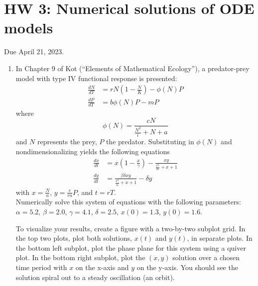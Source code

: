 \documentclass[11pt]{article}
\begin{document}
\section*{HW 3: Numerical solutions of ODE models}
Due April 21, 2023.

\begin{enumerate}
	\item In Chapter 9 of Kot (``Elements of Mathematical Ecology''), a predator-prey model with type IV functional response is presented:
	\begin{align*}
		\frac{dN}{dT} &= rN\left(1-\frac{N}{K}\right) - \phi(N)P\\
		\frac{dP}{dT} &= b\phi(N)P-mP
	\end{align*}
	where
	\[
	\phi(N) = \frac{cN}{\frac{N^2}{i}+N+a}
	\]
	and $N$ represents the prey, $P$ the predator. Substituting in $\phi(N)$ and nondimensionalizing yields the following equations
	\begin{align*}
		\frac{dx}{dt} &= x\left(1-\frac{x}{\gamma}\right) - \frac{xy}{\frac{x^2}{\alpha}+x+1}\\
		\frac{dy}{dt} &= \frac{\beta\delta xy}{\frac{x^2}{\alpha}+x+1} - \delta y
	\end{align*}
	with $x=\frac{N}{a}$, $y=\frac{c}{ra}P$, and $t=rT$.\\
	Numerically solve this system of equations with the following parameters:\\
	$\alpha=5.2$, $\beta=2.0$, $\gamma=4.1$, $\delta=2.5$, $x(0)=1.3$, $y(0)=1.6$.
	
	To visualize your results, create a figure with a two-by-two subplot grid. In the top two plots, plot both solutions, $x(t)$ and $y(t)$, in separate plots. In the bottom left subplot, plot the phase plane for this system using a quiver plot. In the bottom right subplot, plot the $(x,y)$ solution over a chosen time period with $x$ on the x-axis and $y$ on the y-axis. You should see the solution spiral out to a steady oscillation (an orbit).
	

\end{enumerate}
\end{document}
